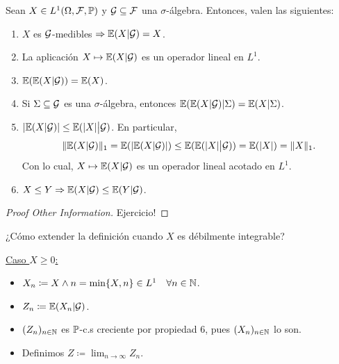 
\begin{property}
	Sean $X \in L^{1}(\Omega, \mathcal{F}, \mathbb{P})$ y $\mathcal{G} \subseteq \mathcal{F}$ una $\sigma$-álgebra. Entonces, valen las siguientes:
	\begin{enumerate}
		\item $X$ es $\mathcal{G}$-medibles $\Rightarrow \mathbb{E}(X | \mathcal{G}) = X$.

		\item La aplicación $X \mapsto \mathbb{E}(X | \mathcal{G})$ es un operador lineal en $L^{1}$.

		\item $\mathbb{E}(\mathbb{E}(X | \mathcal{G})) = \mathbb{E}(X)$.

		\item Si $\Sigma \subseteq \mathcal{G}$ es una $\sigma$-álgebra, entonces $\mathbb{E}(\mathbb{E}(X | \mathcal{G}) | \Sigma) = \mathbb{E}(X | \Sigma)$.

		\item $|\mathbb{E}(X | \mathcal{G})| \leq \mathbb{E}(|X| \big| \mathcal{G})$. En particular,
		\[ \| \mathbb{E}(X | \mathcal{G}) \|_{1} = \mathbb{E}(|\mathbb{E}(X | \mathcal{G})|) \leq \mathbb{E}(\mathbb{E}(|X| \big| \mathcal{G})) = \mathbb{E}(|X|) = \| X \|_{1}. \]
		Con lo cual, $X \mapsto \mathbb{E}(X | \mathcal{G})$ es un operador lineal acotado en $L^{1}$.

		\item $X \leq Y \Rightarrow \mathbb{E}(X | \mathcal{G}) \leq \mathbb{E}(Y | \mathcal{G})$.
	\end{enumerate}
\end{property}
\begin{proof}[Proof Other Information]
	Ejercicio!
\end{proof}

¿Cómo extender la definición cuando $X$ es débilmente integrable?
\par \medskip
\noindent \underline{Caso $X \geq 0$:}

\begin{itemize}
	\item $X_{n} \coloneq X \wedge n = \min \{X,n\} \in L^{1} \quad \forall n \in \mathbb{N}$.

	\item $Z_{n} \coloneq \mathbb{E}(X_{n} | \mathcal{G})$.

	\item $(Z_{n})_{n \in \mathbb{N}}$ es $\mathbb{P}$-c.s creciente por propiedad 6, pues $(X_{n})_{n \in \mathbb{N}}$ lo son.

	\item Definimos $Z \coloneq \lim_{n \to \infty} Z_{n}$.
\end{itemize}

